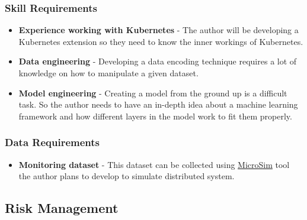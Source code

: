 \subsubsection{Skill Requirements}
\begin{itemize}[noitemsep,nolistsep] 
    \item \textbf{Experience working with Kubernetes} - The author will be developing a Kubernetes extension so they need to know the inner workings of Kubernetes.
    \item \textbf{Data engineering} -  Developing a data encoding technique requires a lot of knowledge on how to manipulate a given dataset.
    \item \textbf{Model engineering} - Creating a model from the ground up is a difficult task. So the author needs to have an in-depth idea about a machine learning framework and how different layers in the model work to fit them properly. 
\end{itemize}

\subsubsection{Data Requirements}
\begin{itemize}[noitemsep,nolistsep] 
\item \textbf{Monitoring dataset} -  This dataset can be collected using \hyperref[microsim]{MicroSim} tool the author plans to develop to simulate distributed system.
\end{itemize}

\subsection{Risk Management}


